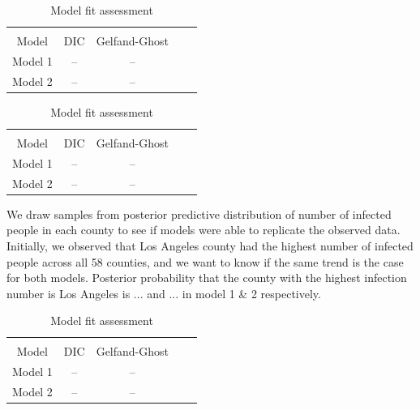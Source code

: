 \documentclass[11pt,twocolumn]{asaproc}
\begin{document}
\begin{table}
\label{table:dic}
\caption{Model fit assessment}
\begin{center}
\begin{tabular}{ccccc}
\hline
\hline
\\[-5pt]
\multicolumn{1}{c}{Model} &
\multicolumn{1}{c}{DIC} &
\multicolumn{1}{c}{Gelfand-Ghost}\\
\hline
 Model 1&	--&	--\\
Model 2&	--&	--\\
\hline
\end{tabular}
\end{center}
\end{table}


\begin{table}
\label{table:dic}
\caption{Model fit assessment}
\begin{center}
\begin{tabular}{ccccc}
\hline
\hline
\\[-5pt]
\multicolumn{1}{c}{Model} &
\multicolumn{1}{c}{DIC} &
\multicolumn{1}{c}{Gelfand-Ghost}\\
\hline
 Model 1&	--&	--\\
Model 2&	--&	--\\
\hline
\end{tabular}
\end{center}
\end{table}


We draw samples from posterior predictive distribution of number of infected people in each county to see if models were able to replicate the observed data. Initially, we observed that Los Angeles county had the highest number of infected people across all 58 counties, and we want to know if the same trend is the case for both models. Posterior probability that the county with the highest infection number is Los Angeles is ...  and ... in model 1 \& 2 respectively. 



\begin{table}
\label{table:dic}
\caption{Model fit assessment}
\begin{center}
\begin{tabular}{ccccc}
\hline
\hline
\\[-5pt]
\multicolumn{1}{c}{Model} &
\multicolumn{1}{c}{DIC} &
\multicolumn{1}{c}{Gelfand-Ghost}\\
\hline
 Model 1&	--&	--\\
Model 2&	--&	--\\
\hline
\end{tabular}
\end{center}
\end{table}
\end{document}
